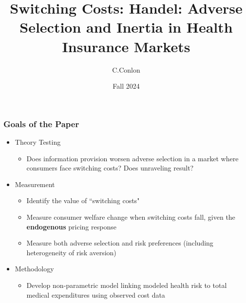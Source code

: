 

\title [Switching]{Switching Costs: Handel: Adverse Selection and Inertia in Health Insurance Markets}
\author{C.Conlon }
\date{Fall 2024}



\begin{frame}
\titlepage
\end{frame}

\begin{frame}
\frametitle{Goals of the Paper}

\begin{itemize}
\item Theory Testing

\begin{itemize}
\item Does information provision worsen adverse selection in a
market where consumers face switching costs? Does unraveling result?
\end{itemize}

\item Measurement

\begin{itemize}
\item Identify the value of ``switching costs"
\item Measure consumer welfare change when switching costs fall, given the
\textbf{endogenous} pricing response

\item Measure both adverse selection and risk preferences (including
heterogeneity of risk aversion)
\end{itemize}

\item Methodology

\begin{itemize}
\item Develop non-parametric model linking modeled health risk to
total medical expenditures using observed cost data
\end{itemize}
\end{itemize}
\end{frame}



